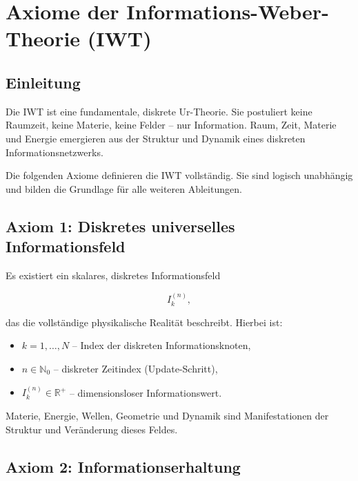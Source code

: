 
\chapter{Axiome der Informations-Weber-Theorie (IWT)}
\label{ch:axiome_iwt}

\section{Einleitung}
\label{sec:axiome_einleitung}

Die IWT ist eine fundamentale, diskrete Ur-Theorie. Sie postuliert keine Raumzeit, keine Materie, keine Felder – nur Information. Raum, Zeit, Materie und Energie emergieren aus der Struktur und Dynamik eines diskreten Informationsnetzwerks.

Die folgenden Axiome definieren die IWT vollständig. Sie sind logisch unabhängig und bilden die Grundlage für alle weiteren Ableitungen.

\section{Axiom 1: Diskretes universelles Informationsfeld}
\label{sec:axiom1}

Es existiert ein skalares, diskretes Informationsfeld

\[
I_k^{(n)},
\]

das die vollständige physikalische Realität beschreibt. Hierbei ist:

\begin{itemize}
    \item \( k = 1, \dots, N \) – Index der diskreten Informationsknoten,
    \item \( n \in \mathbb{N}_0 \) – diskreter Zeitindex (Update-Schritt),
    \item \( I_k^{(n)} \in \mathbb{R}^+ \) – dimensionsloser Informationswert.
\end{itemize}

Materie, Energie, Wellen, Geometrie und Dynamik sind Manifestationen der Struktur und Veränderung dieses Feldes.

\section{Axiom 2: Informationserhaltung}
\label{sec:axiom2}

